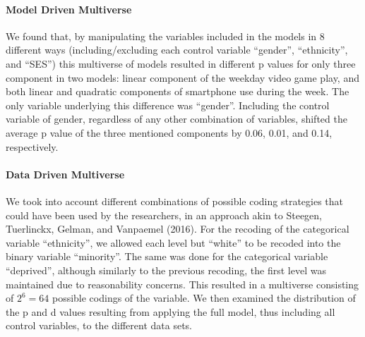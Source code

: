 \documentclass[floatsintext,man]{apa6}
\theoremstyle{definition}
\theoremstyle{definition}
\theoremstyle{definition}
\theoremstyle{remark}
\begin{document}
\hypertarget{model-driven-multiverse}{%
\paragraph{Model Driven Multiverse}\label{model-driven-multiverse}}

We found that, by manipulating the variables included in the models in 8
different ways (including/excluding each control variable
\enquote{gender}, \enquote{ethnicity}, and \enquote{SES}) this
multiverse of models resulted in different p values for only three
component in two models: linear component of the weekday video game
play, and both linear and quadratic components of smartphone use during
the week. The only variable underlying this difference was
\enquote{gender}. Including the control variable of gender, regardless
of any other combination of variables, shifted the average p value of
the three mentioned components by 0.06, 0.01, and 0.14, respectively.

\hypertarget{data-driven-multiverse}{%
\paragraph{Data Driven Multiverse}\label{data-driven-multiverse}}

We took into account different combinations of possible coding
strategies that could have been used by the researchers, in an approach
akin to Steegen, Tuerlinckx, Gelman, and Vanpaemel (2016). For the
recoding of the categorical variable \enquote{ethnicity}, we allowed
each level but \enquote{white} to be recoded into the binary variable
\enquote{minority}. The same was done for the categorical variable
\enquote{deprived}, although similarly to the previous recoding, the
first level was maintained due to reasonability concerns. This resulted
in a multiverse consisting of \(2^6 = 64\) possible codings of the
variable. We then examined the distribution of the p and d values
resulting from applying the full model, thus including all control
variables, to the different data sets.
\end{document}
